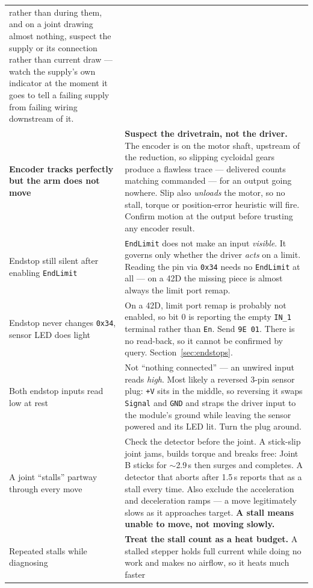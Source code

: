 \documentclass[11pt,letterpaper]{article}
\begin{document}
\begin{longtable}{p{}p{}}
  rather than during them, and on a joint drawing almost nothing, suspect the
  supply or its connection rather than current draw --- watch the supply's own
  indicator at the moment it goes to tell a failing supply from failing wiring
  downstream of it. \\
\textbf{Encoder tracks perfectly but the arm does not move} &
  \textbf{Suspect the drivetrain, not the driver.} The encoder is on the motor
  shaft, upstream of the reduction, so slipping cycloidal gears produce a flawless
  trace --- delivered counts matching commanded --- for an output going nowhere.
  Slip also \emph{unloads} the motor, so no stall, torque or position-error
  heuristic will fire. Confirm motion at the output before trusting any encoder
  result. \\
Endstop still silent after enabling \texttt{EndLimit} &
  \texttt{EndLimit} does not make an input \emph{visible}. It governs only
  whether the driver \emph{acts} on a limit. Reading the pin via \texttt{0x34}
  needs no \texttt{EndLimit} at all --- on a 42D the missing piece is almost
  always the limit port remap. \\
Endstop never changes \texttt{0x34}, sensor LED does light &
  On a 42D, limit port remap is probably not enabled, so bit 0 is reporting the
  empty \texttt{IN\_1} terminal rather than \texttt{En}. Send \texttt{9E 01}.
  There is no read-back, so it cannot be confirmed by query.
  Section~\ref{sec:endstops}. \\
Both endstop inputs read low at rest &
  Not ``nothing connected'' --- an unwired input reads \emph{high}. Most likely a
  reversed 3-pin sensor plug: \texttt{+V} sits in the middle, so reversing it
  swaps \texttt{Signal} and \texttt{GND} and straps the driver input to the
  module's ground while leaving the sensor powered and its LED lit. Turn the plug
  around. \\
A joint ``stalls'' partway through every move &
  Check the detector before the joint. A stick-slip joint jams, builds torque
  and breaks free: Joint B sticks for $\sim$2.9\,s then surges and completes.
  A detector that aborts after 1.5\,s reports that as a stall every time. Also
  exclude the acceleration and deceleration ramps --- a move legitimately slows
  as it approaches target. \textbf{A stall means unable to move, not moving
  slowly.} \\
Repeated stalls while diagnosing &
  \textbf{Treat the stall count as a heat budget.} A stalled stepper holds full
  current while doing no work and makes no airflow, so it heats much faster

\end{longtable}
\end{document}

